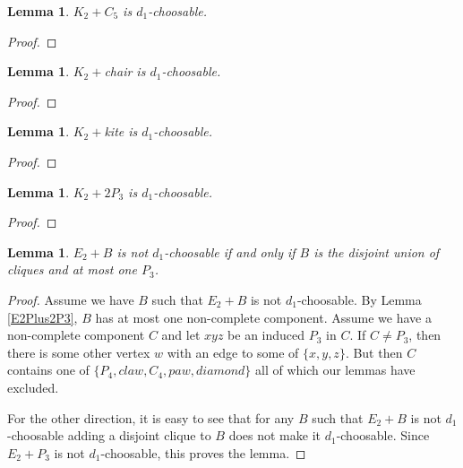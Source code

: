 \documentclass[12pt]{article}
\theoremstyle{plain}
\newtheorem{lem}[thm]{Lemma}
\theoremstyle{definition}
\theoremstyle{remark}
\begin{document}
\begin{lem}\label{K2PlusC5}
$K_2 + C_5$ is $d_1$-choosable.
\end{lem}
\begin{proof}
\end{proof}

\begin{lem}\label{K2PlusChair}
$K_2 +$chair is $d_1$-choosable.
\end{lem}
\begin{proof}
\end{proof}

\begin{lem}\label{K2PlusKite}
$K_2 +$kite is $d_1$-choosable.
\end{lem}
\begin{proof}
\end{proof}

\begin{lem}\label{K2Plus2P3}
$K_2 + 2P_3$ is $d_1$-choosable.
\end{lem}
\begin{proof}
\end{proof}

\begin{lem}\label{E2Classification}
$E_2 + B$ is not $d_1$-choosable if and only if $B$ is the disjoint union of cliques and at most one $P_3$.
\end{lem}
\begin{proof}
Assume we have $B$ such that $E_2 + B$ is not $d_1$-choosable. By Lemma \ref{E2Plus2P3}, $B$ has at most one non-complete component.  Assume we have a non-complete component $C$ and let $xyz$ be an induced $P_3$ in $C$.  If $C \neq P_3$, then there is some other vertex $w$ with an edge to some of $\{x, y, z\}$.  But then $C$ contains one of $\{P_4, claw, C_4, paw, diamond\}$ all of which our lemmas have excluded.\newline

For the other direction, it is easy to see that for any $B$ such that $E_2 + B$ is not $d_1$-choosable adding a disjoint clique to $B$ does not make it $d_1$-choosable.  Since $E_2 + P_3$ is not $d_1$-choosable, this proves the lemma.
\end{proof}
\end{document}
